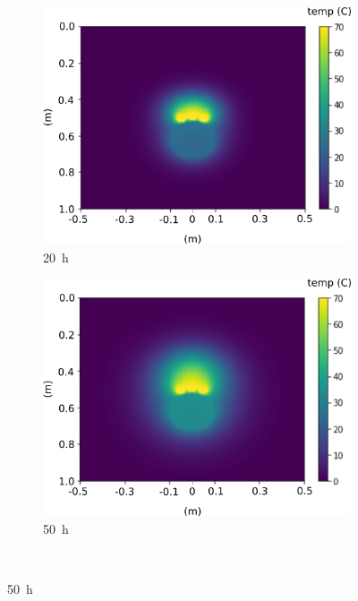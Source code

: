 \documentclass[Journal,letterpaper,InsideFigs]{ascelike-new}
\begin{document}
\begin{figure}
\begin{subfigure}[b]{0.49\textwidth}
    \includegraphics[width=\textwidth]{figs/time-evol/20h.png}
    \caption{\SI{20}{\hour}}
 \end{subfigure}             
 \begin{subfigure}[b]{0.49\textwidth}
    \includegraphics[width=\textwidth]{figs/time-evol/50h.png}
    \caption{\SI{50}{\hour}}
 \end{subfigure}\\           
\end{figure}%
\end{document}
